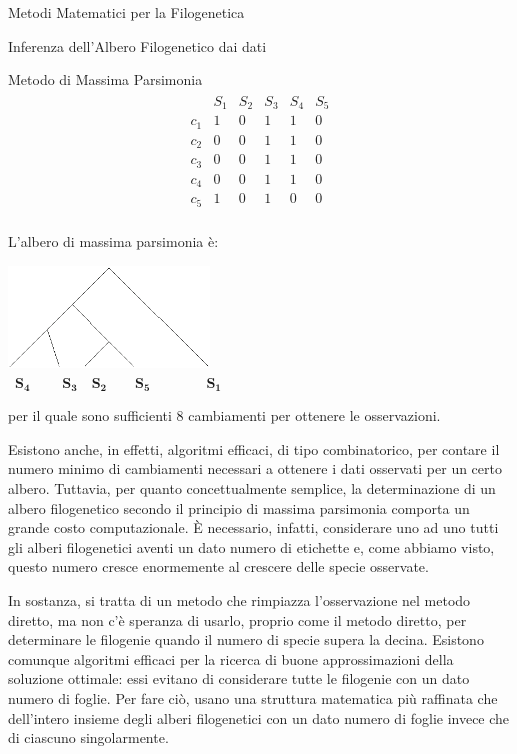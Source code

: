 \documentclass{article}
\begin{document}
\begin{section}{Metodi Matematici per la Filogenetica}
\begin{subsection}{Inferenza dell’Albero Filogenetico dai dati}
\begin{subsubsection}{Metodo di Massima Parsimonia}
				\begin{align*}
					\begin{array}{c|ccccc}
						\phantom a & S_1 & S_2 & S_3 & S_4 & S_5 \\ \hline
						c_1 & 1 & 0 & 1 & 1 & 0 \\ 
						c_2 & 0 & 0 & 1 & 1 & 0 \\
						c_3 & 0 & 0 & 1 & 1 & 0 \\
						c_4 & 0 & 0 & 1 & 1 & 0 \\
						c_5 & 1 & 0 & 1 & 0 & 0
					\end{array}
				\end{align*}	
				\vspace{6pt} \\
				L’albero di massima parsimonia è:
				\begin{center}
					\vspace{6pt}
					\includegraphics[width=0.4\textwidth]{Pics/parsimonia2.png}
					\\
					\emph{$\ \; \mathbf{S_4} \qquad \; \mathbf{S_3} \quad \mathbf{S_2} \qquad \mathbf{S_5} \qquad \qquad \mathbf{S_1}$}
					\vspace{9pt}
				\end{center}
				per il quale sono sufficienti $8$ cambiamenti per ottenere le osservazioni.
				
				Esistono anche, in effetti, algoritmi efficaci, di tipo combinatorico, per contare il numero minimo di cambiamenti necessari a ottenere i dati osservati per un certo albero. Tuttavia, per quanto concettualmente semplice, la determinazione di un albero filogenetico secondo il principio di massima parsimonia comporta un grande costo computazionale. È necessario, infatti, considerare uno ad uno tutti gli alberi filogenetici aventi un dato numero di etichette e, come abbiamo visto, questo numero cresce enormemente al crescere delle specie osservate.
				
				In sostanza, si tratta di un metodo che rimpiazza l'osservazione  nel metodo diretto, ma non c’è speranza di usarlo, proprio come il metodo diretto, per determinare le filogenie quando il numero di specie supera la decina. 
				Esistono comunque algoritmi efficaci per la ricerca di buone approssimazioni della soluzione ottimale: essi evitano di considerare tutte le filogenie con un dato numero di foglie. Per fare ciò, usano una struttura matematica più raffinata che  dell’intero insieme degli alberi filogenetici con un dato numero di foglie invece che di ciascuno singolarmente. 
				

\end{subsubsection}
\end{subsection}
\end{section}
\end{document}
